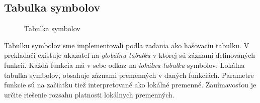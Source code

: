 \documentclass[Slovak, a4paper, 12pt]{article}
\begin{document}
	\subsection{Tabulka symbolov}
		\begin{figure}
			\caption{Tabulka symbolov}
		\end{figure}
	Tabulku symbolov sme implementovali podla zadania ako hašovaciu tabulku. V prekladači existuje ukazaťeľ na \textit{globálnu tabulku} v ktorej sú záznami definovaných funkcií. Každá funkcia má v sebe odkaz na \textit{lokálnu tabulku} symbolov.  Lokálna tabulka symbolov, obsahuje záznami premenných v daných funkciách. Parametre funkcie sú na začiatku tiež interpretované ako lokálné premenné. Zauímavosťou je určite riešenie rozsahu platnosti lokálnych premenných.
\end{document}
